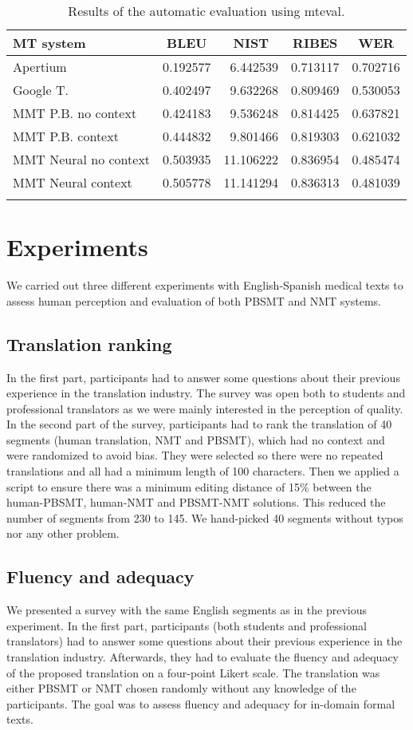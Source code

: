 \documentclass[output=paper]{langsci/langscibook}
\begin{document}
\begin{table}
\begin{tabular}{lrrrr}
\lsptoprule
{MT system} & \multicolumn{1}{c}{BLEU} & \multicolumn{1}{c}{NIST} & \multicolumn{1}{c}{RIBES} & \multicolumn{1}{c}{WER}\\
\midrule
Apertium & 0.192577 & 6.442539 & 0.713117 & 0.702716\\
Google T. & 0.402497 & 9.632268 & 0.809469 & 0.530053\\
MMT P.B. no context & 0.424183 & 9.536248 & 0.814425 & 0.637821\\
MMT P.B. context & 0.444832 & 9.801466 & 0.819303 & 0.621032\\
MMT Neural no context & 0.503935 & 11.106222 & 0.836954 & 0.485474\\
MMT Neural context & 0.505778 & 11.141294 & 0.836313 & 0.481039\\
\lspbottomrule
\end{tabular}
\caption{\label{eval-mteval1reference}Results of the automatic evaluation using mteval.}
\end{table}

\section{Experiments} \label{Experiments}
We carried out three different experiments with English-Spanish medical texts to assess human perception and evaluation of both PBSMT and NMT systems.
\subsection{Translation ranking} \label{Translationranking}
In the first part, participants had to answer some questions about their previous experience in the translation industry. The survey was open both to students and professional translators as we were mainly interested in the perception of quality. In the second part of the survey, participants had to rank the translation of 40 segments (human translation, NMT and PBSMT), which had no context and were randomized to avoid bias. They were selected so there were no repeated translations and all had a minimum length of 100 characters. Then we applied a script to ensure there was a minimum editing distance of 15\% between the human-PBSMT, human-NMT and PBSMT-NMT solutions. This reduced the number of segments from 230 to 145. We hand-picked 40 segments without typos nor any other problem. 
\subsection{Fluency and adequacy}
We presented a survey with the same English segments as in the previous experiment. In the first part, participants (both students and professional translators) had to answer some questions about their previous experience in the translation industry. Afterwards, they had to evaluate the fluency and adequacy of the proposed translation on a four-point Likert scale. The translation was either PBSMT or NMT chosen randomly without any knowledge of the participants. The goal was to assess fluency and adequacy for in-domain formal texts.
\end{document}
